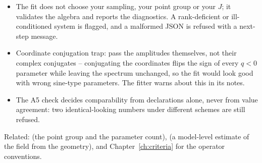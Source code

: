 \begin{refusalbox}
\begin{itemize}
  \item The fit does not choose your sampling, your point group or your $J$;
    it validates the algebra and reports the diagnostics. A rank-deficient or
    ill-conditioned system is flagged, and a malformed JSON is refused with a
    next-step message.
  \item Coordinate conjugation trap: pass the amplitudes themselves, not their
    complex conjugates -- conjugating the coordinates flips the sign of every
    $q < 0$ parameter while leaving the spectrum unchanged, so the fit would
    look good with wrong sine-type parameters. The fitter warns about this in
    its notes.
  \item The A5 check decides comparability from declarations alone, never from
    value agreement: two identical-looking numbers under different schemes are
    still refused.
\end{itemize}
\end{refusalbox}

Related:  (the point group and the parameter count),  (a
model-level estimate of the field from the geometry), and
Chapter~\ref{ch:criteria} for the operator conventions.
